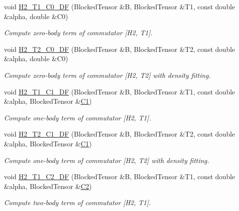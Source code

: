 \begin{DoxyCompactItemize}
void \mbox{\hyperlink{classforte_1_1_m_r_d_s_r_g_a35996d5d7eb2c0be1d8fd285d4ab5859}{H2\+\_\+\+T1\+\_\+\+C0\+\_\+\+DF}} (Blocked\+Tensor \&B, Blocked\+Tensor \&T1, const double \&alpha, double \&C0)
\begin{DoxyCompactList}\small\item\em Compute zero-\/body term of commutator \mbox{[}H2, T1\mbox{]}. \end{DoxyCompactList}\item 
void \mbox{\hyperlink{classforte_1_1_m_r_d_s_r_g_a1a0bb37a176d3ec04952088c2fe7f079}{H2\+\_\+\+T2\+\_\+\+C0\+\_\+\+DF}} (Blocked\+Tensor \&B, Blocked\+Tensor \&T2, const double \&alpha, double \&C0)
\begin{DoxyCompactList}\small\item\em Compute zero-\/body term of commutator \mbox{[}H2, T2\mbox{]} with density fitting. \end{DoxyCompactList}\item 
void \mbox{\hyperlink{classforte_1_1_m_r_d_s_r_g_a4386798a190dee103bada2500e04f66d}{H2\+\_\+\+T1\+\_\+\+C1\+\_\+\+DF}} (Blocked\+Tensor \&B, Blocked\+Tensor \&T1, const double \&alpha, Blocked\+Tensor \&\mbox{\hyperlink{namespaceforte_abe00ec86d0015c0f2b6ac298c6e428e4a1a2ddc2db4693cfd16d534cde5572cc1}{C1}})
\begin{DoxyCompactList}\small\item\em Compute one-\/body term of commutator \mbox{[}H2, T1\mbox{]}. \end{DoxyCompactList}\item 
void \mbox{\hyperlink{classforte_1_1_m_r_d_s_r_g_ac7db5ffe78f4e71f2cda880a4359764e}{H2\+\_\+\+T2\+\_\+\+C1\+\_\+\+DF}} (Blocked\+Tensor \&B, Blocked\+Tensor \&T2, const double \&alpha, Blocked\+Tensor \&\mbox{\hyperlink{namespaceforte_abe00ec86d0015c0f2b6ac298c6e428e4a1a2ddc2db4693cfd16d534cde5572cc1}{C1}})
\begin{DoxyCompactList}\small\item\em Compute one-\/body term of commutator \mbox{[}H2, T2\mbox{]} with density fitting. \end{DoxyCompactList}\item 
void \mbox{\hyperlink{classforte_1_1_m_r_d_s_r_g_a7e71050dc24302f46d2efbb31038a0dd}{H2\+\_\+\+T1\+\_\+\+C2\+\_\+\+DF}} (Blocked\+Tensor \&B, Blocked\+Tensor \&T1, const double \&alpha, Blocked\+Tensor \&\mbox{\hyperlink{namespaceforte_abe00ec86d0015c0f2b6ac298c6e428e4af1a543f5a2c5d49bc5dde298fcf716e4}{C2}})
\begin{DoxyCompactList}\small\item\em Compute two-\/body term of commutator \mbox{[}H2, T1\mbox{]}. \end{DoxyCompactList}\item 

\end{DoxyCompactItemize}
